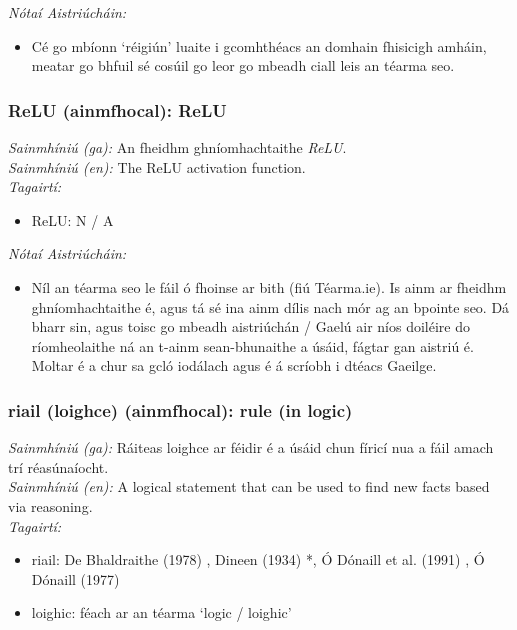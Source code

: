  \noindent \textit{Nótaí Aistriúcháin:}
\begin{itemize}
	\item Cé go mbíonn `réigiún' luaite i gcomhthéacs an domhain fhisicigh amháin, meatar go bhfuil sé cosúil go leor go mbeadh ciall leis an téarma seo.
\end{itemize}


\subsubsection*{ReLU (ainmfhocal): ReLU}
 \noindent \textit{Sainmhíniú (ga):} An fheidhm ghníomhachtaithe  \noindent \textit{ReLU}.
\\
 \noindent \textit{Sainmhíniú (en):} The ReLU activation function.
\\
 \noindent \textit{Tagairtí:}
\begin{itemize}
	\item ReLU: N / A
\end{itemize}

 \noindent \textit{Nótaí Aistriúcháin:}
\begin{itemize}
	\item Níl an téarma seo le fáil ó fhoinse ar bith (fiú Téarma.ie). Is ainm ar fheidhm ghníomhachtaithe é, agus tá sé ina ainm dílis nach mór ag an bpointe seo. Dá bharr sin, agus toisc go mbeadh aistriúchán / Gaelú air níos doiléire do ríomheolaithe ná an t-ainm sean-bhunaithe a úsáid, fágtar gan aistriú é. Moltar é a chur sa gcló iodálach agus é á scríobh i dtéacs Gaeilge.
\end{itemize}


\subsubsection*{riail (loighce) (ainmfhocal): rule (in logic)}
 \noindent \textit{Sainmhíniú (ga):} Ráiteas loighce ar féidir é a úsáid chun fíricí nua a fáil amach trí réasúnaíocht.
\\
 \noindent \textit{Sainmhíniú (en):} A logical statement that can be used to find new facts based via reasoning.
\\
 \noindent \textit{Tagairtí:}
\begin{itemize}
	\item riail: De Bhaldraithe (1978) \cite{de-bhaldraithe}, Dineen (1934) \cite{dineen}*, Ó Dónaill et al. (1991) \cite{focloir-beag}, Ó Dónaill (1977) \cite{odonaill}
	\item loighic: féach ar an téarma `logic / loighic'
\end{itemize}

